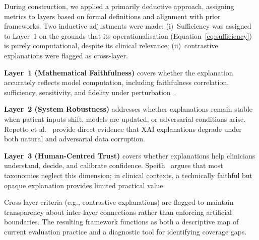 During construction, we applied a primarily deductive approach, assigning metrics to layers based on formal definitions and alignment with prior frameworks. Two inductive adjustments were made: (i)~Sufficiency was assigned to Layer~1 on the grounds that its operationalisation (Equation~\ref{eq:sufficiency}) is purely computational, despite its clinical relevance; (ii)~contrastive explanations were flagged as cross-layer.

\textbf{Layer~1 (Mathematical Faithfulness)} covers whether the explanation accurately reflects model computation, including faithfulness correlation, sufficiency, sensitivity, and fidelity under perturbation~\cite{kadir2023evaluation,jin2023guidelines}.

\textbf{Layer~2 (System Robustness)} addresses whether explanations remain stable when patient inputs shift, models are updated, or adversarial conditions arise. Repetto et al.~\cite{Repetto2025EvaluatingTR} provide direct evidence that XAI explanations degrade under both natural and adversarial data corruption.

\textbf{Layer~3 (Human-Centred Trust)} covers whether explanations help clinicians understand, decide, and calibrate confidence. Speith~\cite{speith2022review} argues that most taxonomies neglect this dimension; in clinical contexts, a technically faithful but opaque explanation provides limited practical value.

Cross-layer criteria (e.g., contrastive explanations) are flagged to maintain transparency about inter-layer connections rather than enforcing artificial boundaries. The resulting framework functions as both a descriptive map of current evaluation practice and a diagnostic tool for identifying coverage gaps.
